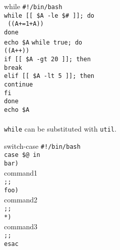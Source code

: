 \documentclass{beamer}
\let\tt\texttt
\begin{document}
\begin{frame}{while}
        \tt{\#!/bin/bash}                       \\
        \tt{while [[ \$A -le \$\# ]]; do}       \\
        \quad \tt{ ((A+=1+A)) }                 \\
        \tt{done}                               \\
        \tt{echo \$A}
        \tt{while true; do}                     \\
        \quad \tt{((A++))}                      \\
        \quad \tt{if [[ \$A -gt 20 ]]; then}    \\
        \quad \quad \tt{break}                  \\
        \quad \tt{elif [[ \$A -lt 5 ]]; then}   \\
        \quad \quad \tt{continue}               \\
        \quad \tt{fi}                           \\
        \tt{done}                               \\
        \tt{echo \$A}                           \\
        \quad                                   \\
        \tt{while} can be substituted with \tt{util}.
\end{frame}

\begin{frame}{switch-case}
        \tt{\#!/bin/bash}                       \\
        \tt{case \$@ in}                        \\
        \quad \tt{bar)}                         \\
        \quad \quad command1                    \\
        \quad \tt{;;}                           \\
        \quad \tt{foo)}                         \\
        \quad \quad command2                    \\
        \quad \tt{;;}                           \\
        \quad \tt{*)}                           \\
        \quad \quad command3                    \\
        \quad \tt{;;}                           \\
        \tt{esac}                               \\
\end{frame}
\end{document}
